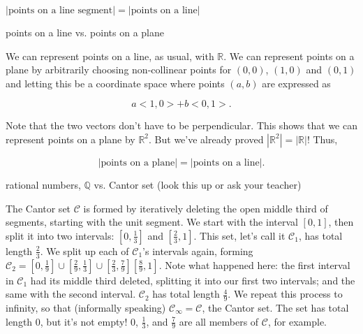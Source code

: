 \documentclass[../key.tex]{subfiles}
\begin{document}
$|\text{points on a line segment}| = |\text{points on a line}|$

\begin{inner_problem}
\item points on a line vs. points on a plane
\end{inner_problem}

\noindent We can represent points on a line, as usual, with $\mathbb{R}$. We can represent points on a plane by arbitrarily choosing non-collinear points for $(0,0)$, $(1,0)$ and $(0,1)$ and letting this be a coordinate space where points $(a,b)$ are expressed as

$$a<1,0>+b<0,1>.$$

\noindent Note that the two vectors don't have to be perpendicular. This shows that we can represent points on a plane by $\mathbb{R}^2$. But we've already proved $\left|\mathbb{R}^2\right| = |\mathbb{R}|$! Thus,

$$\left|\text{points on a plane}\right| = \left|\text{points on a line}\right|.$$

\begin{inner_problem}
\item rational numbers, $\mathbb{Q}$ vs. Cantor set (look this up or ask your teacher)
\end{inner_problem}

\noindent The Cantor set $\mathcal{C}$ is formed by iteratively deleting the open middle third of segments, starting with the unit segment. We start with the interval $[0,1]$, then split it into two intervals: $\left[0, \frac{1}{3}\right]$ and $\left[\frac{2}{3}, 1\right]$. This set, let's call it $\mathcal{C}_1$, has total length $\frac{2}{3}$. We split up each of $\mathcal{C}_1$'s intervals again, forming $\mathcal{C}_2=\left[0,
\frac{1}{9}\right]\cup\left[\frac{2}{9},\frac{1}{3}\right]\cup\left[\frac{2}{3},\frac{7}{9}\right]\left[\frac{8}{9},1\right]$. Note what happened here: the first interval in $\mathcal{C}_1$ had its middle third deleted, splitting it into our first two intervals; and the same with the second interval. $\mathcal{C}_2$ has total length $\frac{4}{9}$. We repeat this process to infinity, so that (informally speaking) $\mathcal{C}_{\infty} = \mathcal{C}$, the Cantor set. The set has total
length $0$, but it's not empty! $0$, $\frac{1}{3}$, and $\frac{7}{9}$ are all members of $\mathcal{C}$, for example. 
\end{document}
